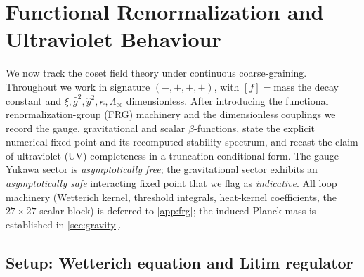 \section{Functional Renormalization and Ultraviolet Behaviour}
\label{sec:frg:main}

We now track the coset field theory under continuous coarse-graining.
Throughout we work in signature $(-,+,+,+)$, with $[f]=\text{mass}$ the
decay constant and $\xi,\hat g^{2},\hat y^{2},\kappa,\Lambda_{\mathrm{cc}}$
dimensionless. After introducing the functional renormalization-group
(FRG) machinery and the dimensionless couplings we record the gauge,
gravitational and scalar $\beta$-functions, state the explicit numerical
fixed point and its recomputed stability spectrum, and recast the claim of
ultraviolet (UV) completeness in a truncation-conditional form.
The gauge--Yukawa sector is \emph{asymptotically free}; the gravitational
sector exhibits an \emph{asymptotically safe} interacting fixed point that
we flag as \emph{indicative}. All loop machinery (Wetterich kernel,
threshold integrals, heat-kernel coefficients, the $27\times27$ scalar
block) is deferred to \autoref{app:frg}; the induced Planck mass is
established in \autoref{sec:gravity}.

\subsection{Setup: Wetterich equation and Litim regulator}
\label{sec:frg:setup}

